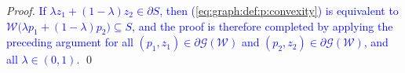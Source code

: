 \documentclass[smallextended]{svjour3}       %
\numberwithin{equation}{section}
\newcommand{\revision}[1]{\textcolor{blue}{#1}}
\begin{document}
\begin{proof}
  \revision{If $\lambda z_1 + (1-\lambda ) z_2 \in\partial S$, then (\ref{eq:graph:def:p:convexity}) is equivalent to $\mathcal W\bigl(\lambda p_1 + (1-\lambda) p_2 \bigr) \subseteq S$, and the proof is therefore completed by applying the preceding argument for all $(p_1,z_1) \in\partial\mathscr G(\mathcal W)$ and $(p_2,z_2)\in\partial\mathscr G(\mathcal W)$, and all $\lambda\in (0,1)$.}
  \qed

\end{proof}
%
\end{document}
